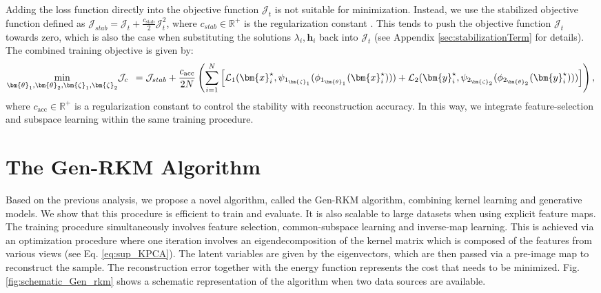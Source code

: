 \documentclass[preview,border=0.3pt]{standalone}
\begin{document}
Adding the loss function directly into the objective function $\mathcal{J}_t$ is not suitable for minimization. Instead, we use the stabilized objective function defined as $\mathcal{J}_{stab} = \mathcal{J}_{t} + \frac{c_{\mathrm{stab}}}{2} \mathcal{J}_{t}^2 $, where $c_{stab}\in \mathbb{R}^{+}$ is the regularization constant \cite{suykens_deep_2017}. This tends to push the objective function $\mathcal{J}_t$ towards zero, which is also the case when substituting the solutions $\lambda_i , \bm{h}_i$ back into $\mathcal{J}_t$ (see Appendix \ref{sec:stabilizationTerm} for details). The combined training objective is given by:
\begin{equation}
    \label{eq:combined_trainigEq}
    \underset{\bm{\theta}_1,\bm{\theta}_2,\bm{\zeta}_1,\bm{\zeta}_2}{\min} \mathcal{J}_{c} \enskip  = \mathcal{J}_{stab} + \frac{c_{\mathrm{acc}}}{2 N}\left(\sum_{i=1}^N\left[ \mathcal{L}_1(\bm{x}_i^\star,\psi_{1_{\bm{\zeta}_{1}}} (\phi_{1_{\bm{\theta}_{1}}} (\bm{x}_i^\star)))  + \mathcal{L}_2(\bm{y}_i^\star,\psi_{2_{\bm{\zeta}_{2}}} (\phi_{2_{\bm{\theta}_{2}}} (\bm{y}_i^\star))) \right] \right), \\
\end{equation}
where $c_{\mathrm{acc}}\in \mathbb{R}^+$ is a regularization constant to control the stability with reconstruction accuracy. In this way, we integrate feature-selection and subspace learning within the same training procedure.

\section{The Gen-RKM Algorithm \label{sec:algo}}
%
Based on the previous analysis, we propose a novel algorithm, called the Gen-RKM algorithm, combining kernel learning and generative models. We show that this procedure is efficient to train and evaluate. It is also scalable to large datasets when using explicit feature maps. The training procedure simultaneously involves feature selection, common-subspace learning and inverse-map learning. This is achieved via an optimization procedure where one iteration involves an eigendecomposition of the kernel matrix which is composed of the features from various views (see Eq. \ref{eq:sup_KPCA}). The latent variables are given by the eigenvectors, which are then passed via a pre-image map to reconstruct the sample. The  reconstruction error together with the energy function represents the cost that needs to be minimized. Fig. \ref{fig:schematic_Gen_rkm} shows a schematic representation of the algorithm when two data sources are available.
\end{document}
